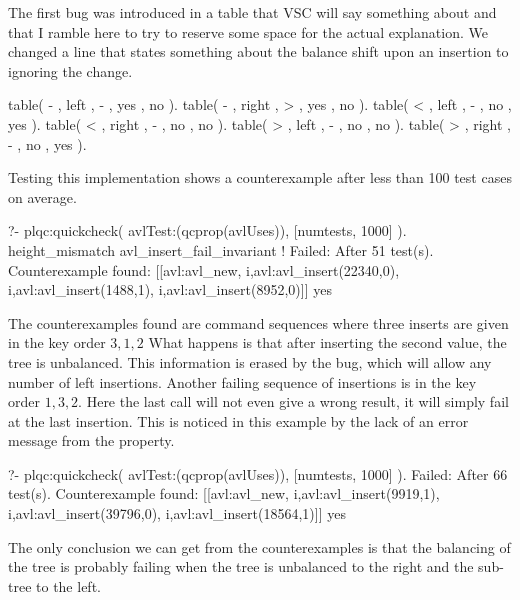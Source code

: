 The first bug was introduced in a table that VSC will say something
about and that I ramble here to try to reserve some space for the actual
explanation.
%
We changed a line that states something about the balance shift upon an
insertion to ignoring the change.
\begin{yapcode}
 table( -  , left   , -  , yes  , no   ).
 table( -  , right  , >  , yes  , no   ).
 table( <  , left   , -  , no   , yes  ).
 table( <  , right  , -  , no   , no   ).
 table( >  , left   , -  , no   , no   ).
 table( >  , right  , -  , no   , yes  ).
\end{yapcode}
%
%
Testing this implementation shows a counterexample after less than 100
test cases on average.
%
\begin{yapcode}
   ?- plqc:quickcheck(
                avlTest:(qcprop(avlUses)),
                [{numtests, 1000}] ).
 height_mismatch
 avl_insert_fail_invariant
 !
 Failed: After 51 test(s).
 Counterexample found:
   [[avl:avl_new,
     {i,avl:avl_insert(22340,0)},
     {i,avl:avl_insert(1488,1)},
     {i,avl:avl_insert(8952,0)}]] 
 yes
\end{yapcode}
%
The counterexamples found are command sequences where three inserts are
given in the key order $3, 1, 2$
%
What happens is that after inserting the second value, the tree is
unbalanced.
%
This information is erased by the bug, which will allow any number of
left insertions.
%
Another failing sequence of insertions is in the key order $1, 3, 2$.
%
Here the last call will not even give a wrong result, it will simply
fail at the last insertion.
%
This is noticed in this example by the lack of an error message from the
property.
%
\begin{yapcode}
   ?- plqc:quickcheck(
           avlTest:(qcprop(avlUses)),
           [{numtests, 1000}] ).
 Failed: After 66 test(s).
 Counterexample found:
   [[avl:avl_new,
     {i,avl:avl_insert(9919,1)},
     {i,avl:avl_insert(39796,0)},
     {i,avl:avl_insert(18564,1)}]]
 yes
\end{yapcode}
%
The only conclusion we can get from the counterexamples is that the
balancing of the tree is probably failing when the tree is unbalanced to
the right and the sub-tree to the left.



